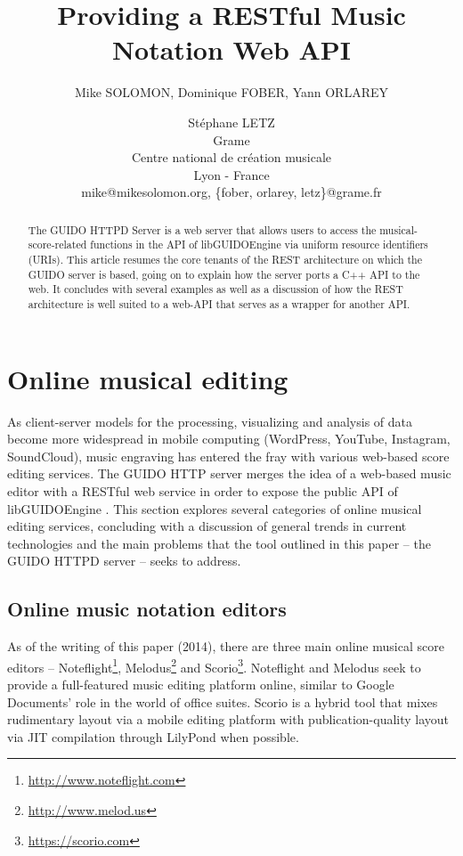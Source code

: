 \documentclass[11pt,a4paper]{article}
\title{Providing a RESTful Music Notation Web API}
\author
{Mike SOLOMON, Dominique FOBER, Yann ORLAREY \and Stéphane LETZ
\\ Grame
\\ Centre national de création musicale
\\ Lyon - France 
\\ mike@mikesolomon.org, \{fober, orlarey, letz\}@grame.fr 
}
\date{}
\newcommand{\footurl}[1]	{\footnote{\url{#1}}}
\begin{document}
\maketitle

\begin{abstract}

The GUIDO HTTPD Server is a web server that allows users to access the musical-score-related functions in the API of libGUIDOEngine via uniform resource identifiers (URIs).  This article resumes the core tenants of the REST architecture on which the GUIDO server is based, going on to explain how the server ports a C++ API to the web.  It concludes with several examples as well as a discussion of how the REST architecture is well suited to a web-API that serves as a wrapper for another API.
\end{abstract}


\section{Online musical editing}\label{section:online-musical-editing}
As client-server models for the processing, visualizing and analysis of data become more widespread in mobile computing (WordPress, YouTube, Instagram, SoundCloud), music engraving has entered the fray with various web-based score editing services.  The GUIDO HTTP server merges the idea of a web-based music editor with a RESTful web service in order to expose the public API of libGUIDOEngine \cite{guido}. This section explores several categories of online musical editing services, concluding with a discussion of general trends in current technologies and the main problems that the tool outlined in this paper -- the GUIDO HTTPD server -- seeks to address.
\subsection{Online music notation editors}\label{subsection:editor}
As of the writing of this paper (2014), there are three main online musical score editors -- Noteflight\footurl{http://www.noteflight.com}, Melodus\footurl{http://www.melod.us} and Scorio\footurl{https://scorio.com}.  Noteflight and Melodus seek to provide a full-featured music editing platform online, similar to Google Documents' role in the world of office suites.  Scorio is a hybrid tool that mixes rudimentary layout via a mobile editing platform with publication-quality layout via JIT compilation through LilyPond when possible.
\end{document}
